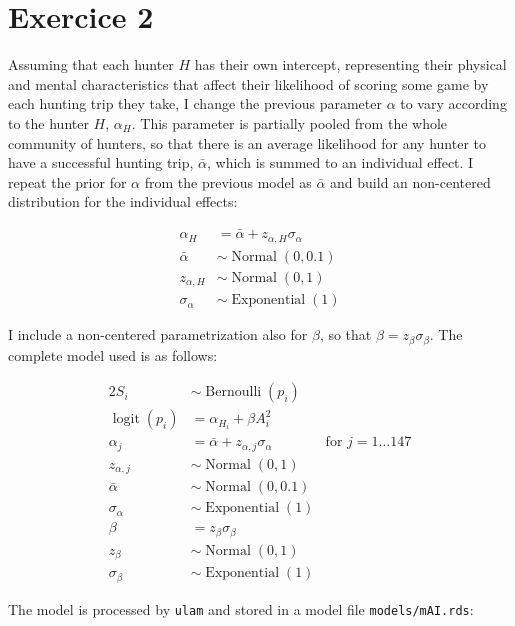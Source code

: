 \documentclass[article, a4paper, 12pt]{memoir}
\DeclareMathOperator{\logit}{logit}
\DeclareMathOperator{\normal}{Normal}
\DeclareMathOperator{\exponential}{Exponential}
\DeclareMathOperator{\bernoulli}{Bernoulli}
\begin{document}
\chapter*{Exercice 2}

Assuming that each hunter $H$ has their own intercept, representing their physical and mental characteristics that affect their likelihood of scoring some game by each hunting trip they take, I change the previous parameter $\alpha$ to vary according to the hunter $H$, $\alpha_H$.
This parameter is partially pooled from the whole community of hunters, so that there is an average likelihood for any hunter to have a successful hunting trip, $\bar{\alpha}$, which is summed to an individual effect. I repeat the prior for $\alpha$ from the previous model as $\bar{\alpha}$ and build an non-centered distribution for the individual effects:

\begin{align*}
    \alpha_H& = \bar{\alpha} + z_{\alpha,H}\sigma_\alpha\\
    \bar{\alpha}& \sim \normal(0, 0.1)\\
    z_{\alpha,H}& \sim \normal(0,1)\\
    \sigma_\alpha& \sim \exponential(1)
\end{align*}

I include a non-centered parametrization also for $\beta$, so that $\beta = z_\beta\sigma_\beta$. The complete model used is as follows:

\begin{alignat*}{2}
    S_i& \sim \bernoulli(p_i)&\\
    \logit(p_i)& = \alpha_{H_i} + \beta A_i^2&\\
    \alpha_j& = \bar{\alpha} + z_{\alpha,j}\sigma_\alpha{}& \text{for $j = 1 \dots 147$}\\
    z_{\alpha,j}& \sim \normal(0,1)&\\
    \bar{\alpha}& \sim \normal(0, 0.1)&\\
    \sigma_\alpha& \sim \exponential(1)&\\
    \beta& = z_{\beta}\sigma_\beta&\\
    z_{\beta}& \sim \normal(0,1)&\\
    \sigma_\beta& \sim \exponential(1)&
\end{alignat*}


The model is processed by \texttt{ulam} and stored in a model file \texttt{models/mAI.rds}:


\end{document}
